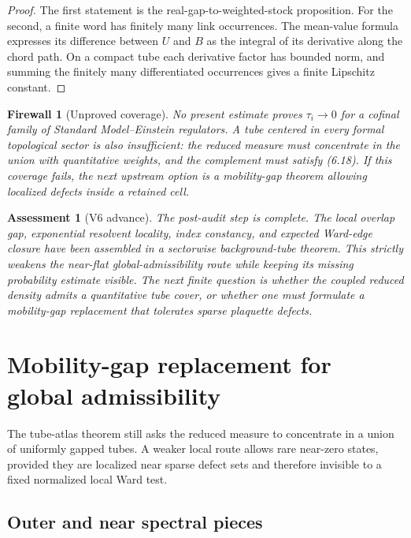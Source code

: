 \documentclass[11pt]{article}
\newtheorem{assessment}[theorem]{Assessment}
\newtheorem{firewall}[theorem]{Firewall}
\begin{document}
\begin{proof}
The first statement is the real-gap-to-weighted-stock proposition.
For the second, a finite word has finitely many link occurrences.
The mean-value formula expresses its difference between \(U\) and \(B\)
as the integral of its derivative along the chord path.  On a compact
tube each derivative factor has bounded norm, and summing the finitely
many differentiated occurrences gives a finite Lipschitz constant.
\end{proof}

\begin{firewall}[Unproved coverage]
\label{fw:v11v6-coverage}
No present estimate proves \(\tau_i\to0\) for a cofinal family of
Standard Model--Einstein regulators.  A tube centered in every formal
topological sector is also insufficient: the reduced measure must
concentrate in the union with quantitative weights, and the complement
must satisfy (6.18).  If this coverage fails, the next upstream option is
a mobility-gap theorem allowing localized defects inside a retained
cell.
\end{firewall}

\begin{assessment}[V6 advance]
\label{ass:v11v6}
The post-audit step is complete.  The local overlap gap, exponential
resolvent locality, index constancy, and expected Ward-edge closure have
been assembled in a sectorwise background-tube theorem.  This strictly
weakens the near-flat global-admissibility route while keeping its missing
probability estimate visible.  The next finite question is whether the
coupled reduced density admits a quantitative tube cover, or whether one
must formulate a mobility-gap replacement that tolerates sparse
plaquette defects.
\end{assessment}


\section{Mobility-gap replacement for global admissibility}
\label{sec:v11v7}

The tube-atlas theorem still asks the reduced measure to concentrate in a
union of uniformly gapped tubes.  A weaker local route allows rare
near-zero states, provided they are localized near sparse defect sets and
therefore invisible to a fixed normalized local Ward test.

\subsection{Outer and near spectral pieces}
\end{document}
